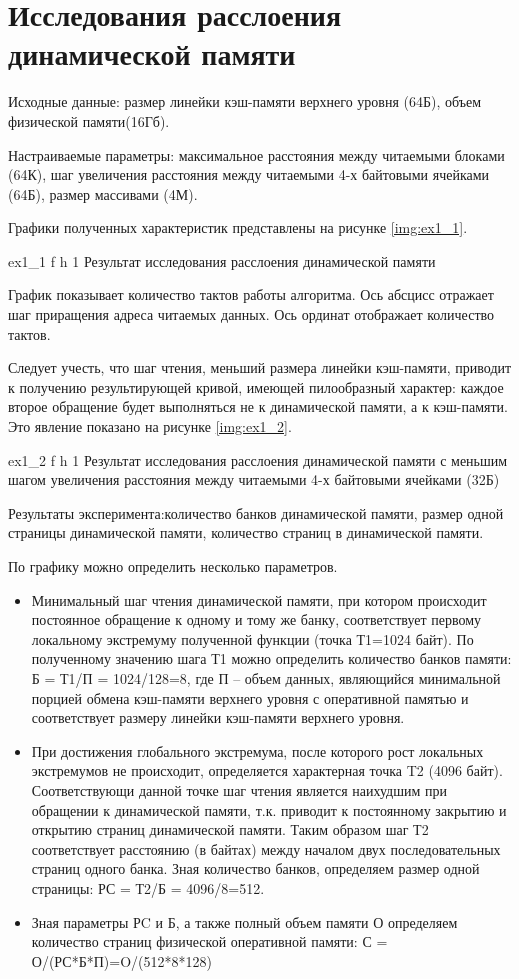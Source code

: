 \chapter{Исследования расслоения динамической памяти}

Исходные данные: размер линейки кэш-памяти верхнего уровня (64Б), объем физической памяти(16Гб).

Настраиваемые параметры: максимальное расстояния между  читаемыми блоками (64К),
шаг увеличения расстояния между читаемыми 4-х байтовыми ячейками (64Б),
размер массивами (4М).

Графики полученных характеристик представлены на рисунке \ref{img:ex1_1}.

{ex1_1}
{f}
{h}
{1\textwidth}
{Результат исследования расслоения динамической памяти}

График показывает количество тактов работы алгоритма.
Ось абсцисс отражает шаг приращения адреса читаемых данных.
Ось ординат отображает количество тактов.

Следует учесть, что шаг чтения, меньший размера линейки кэш-памяти,
приводит к получению результирующей кривой,
имеющей пилообразный характер:
каждое второе обращение будет выполняться не к динамической памяти, а к кэш-памяти.
Это явление показано на рисунке \ref{img:ex1_2}.

{ex1_2}
{f}
{h}
{1\textwidth}
{Результат исследования расслоения динамической памяти с меньшим шагом увеличения расстояния между читаемыми 4-х байтовыми ячейками (32Б)}

Результаты эксперимента:количество банков динамической памяти, размер одной страницы динамической памяти, количество страниц в динамической памяти.

По графику можно определить несколько параметров.
\begin{itemize}
    \item Минимальный шаг чтения динамической памяти, при котором происходит постоянное обращение к одному и тому же банку, соответствует первому локальному экстремуму полученной функции (точка Т1=1024 байт).
По полученному значению шага Т1 можно определить количество банков памяти: Б = Т1/П = 1024/128=8, где П – объем данных, являющийся минимальной порцией обмена кэш-памяти верхнего уровня с оперативной памятью и соответствует размеру линейки кэш-памяти верхнего уровня.
    \item При достижения глобального экстремума, после которого рост локальных экстремумов не происходит, определяется характерная точка T2 (4096 байт).
    Соответствующи данной точке шаг чтения является наихудшим при обращении к динамической памяти, т.к. приводит к постоянному закрытию и открытию страниц динамической памяти.
    Таким образом шаг Т2 соответствует расстоянию (в байтах) между началом двух последовательных страниц одного банка.
    Зная количество банков, определяем размер одной страницы: РС = Т2/Б = 4096/8=512.
    \item Зная параметры РC и Б, а также полный объем памяти О определяем количество страниц физической оперативной памяти: С = О/(РС*Б*П)=O/(512*8*128)
\end{itemize}

